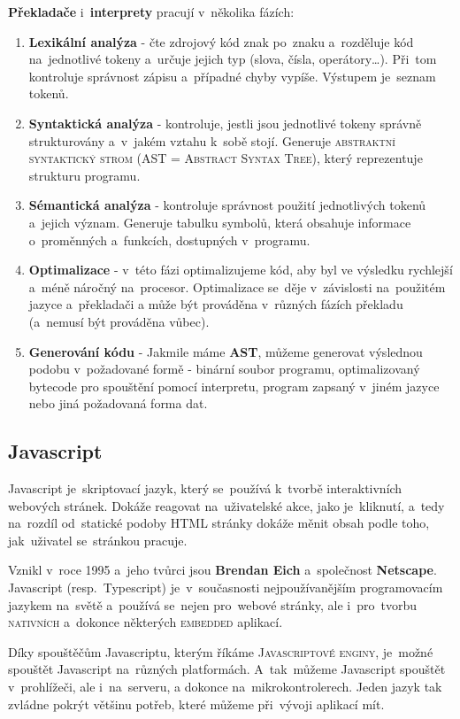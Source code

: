 \documentclass[14pt,a4paper]{article}
\begin{document}
        \textbf{Překladače} i~\textbf{interprety} pracují v~několika fázích:
        \begin{enumerate}
            \item \textbf{Lexikální analýza} - čte zdrojový kód znak po~znaku a~rozděluje kód na~jednotlivé tokeny a~určuje jejich typ (slova, čísla, operátory\dots). Při~tom kontroluje správnost zápisu a~případné chyby vypíše. Výstupem je~seznam tokenů.
            \item \textbf{Syntaktická analýza} - kontroluje, jestli jsou jednotlivé tokeny správně strukturovány a~v~jakém vztahu k~sobě stojí. Generuje \textsc{abstraktní syntaktický strom (AST = Abstract Syntax Tree)}, který reprezentuje strukturu programu.
            \item \textbf{Sémantická analýza} - kontroluje správnost použití jednotlivých tokenů a~jejich význam. Generuje tabulku symbolů, která obsahuje informace o~proměnných a~funkcích, dostupných v~programu.
            \item \textbf{Optimalizace} - v~této fázi optimalizujeme kód, aby byl ve výsledku rychlejší a~méně náročný na~procesor. Optimalizace se~děje v~závislosti na~použitém jazyce a~překladači a může být prováděna v~různých fázích překladu (a~nemusí být prováděna vůbec).
            \item \textbf{Generování kódu} - Jakmile máme \textbf{AST}, můžeme generovat výslednou podobu v~požadované formě - binární soubor programu, optimalizovaný bytecode pro spouštění pomocí interpretu, program zapsaný v~jiném jazyce nebo jiná požadovaná forma dat.
        \end{enumerate}

        \subsection{Javascript}
        Javascript je~skriptovací jazyk, který se~používá k~tvorbě interaktivních webových stránek. Dokáže reagovat na~uživatelské akce, jako je~kliknutí, a~tedy na~rozdíl od~statické podoby HTML stránky dokáže měnit obsah podle toho, jak~uživatel se~stránkou pracuje.

        Vznikl v~roce 1995 a~jeho tvůrci jsou \textbf{Brendan Eich} a~společnost \textbf{Netscape}. Javascript (resp.~Typescript) je~v~současnosti nejpoužívanějším programovacím jazykem na~světě a~používá se~nejen pro~webové stránky, ale i~pro~tvorbu \textsc{nativních} a~dokonce některých \textsc{embedded} aplikací.

        Díky spouštěčům Javascriptu, kterým říkáme \textsc{Javascriptové enginy}, je~možné spouštět Javascript na~různých platformách. A~tak~můžeme Javascript spouštět v~prohlížeči, ale i~na~serveru, a dokonce na~mikrokontrolerech. Jeden jazyk tak zvládne pokrýt většinu potřeb, které můžeme při~vývoji aplikací mít.
\end{document}
